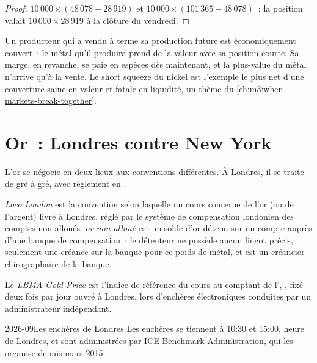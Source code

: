 \begin{proof}
$10\,000 \times (48\,078 - 28\,919)$ et $10\,000 \times (101\,365 - 48\,078)$~; la position valait
$10\,000 \times 28\,919$ à la clôture du vendredi.
\end{proof}

Un producteur qui a vendu à terme sa production future est économiquement couvert~: le métal
qu'il produira prend de la valeur avec sa position courte. Sa marge, en revanche, se paie en espèces dès maintenant, et la
plus-value du métal n'arrive qu'à la vente. Le short squeeze du nickel est l'exemple le plus net d'une couverture
saine en valeur et fatale en liquidité, un thème du \cref{ch:m3:when-markets-break-together}.

\section{Or~: Londres contre New York}

L'or se négocie en deux lieux aux conventions différentes. À Londres, il se traite de gré à gré,
avec règlement en .

\begin{definition}\label{def:m3:metals:loco}
\emph{Loco London} est la convention selon laquelle un cours concerne de l'or (ou de l'argent)
livré à Londres, réglé par le système de compensation londonien des comptes non alloués.
\emph{or non alloué} est un solde d'or détenu sur un compte auprès d'une banque
de compensation~: le détenteur ne possède aucun lingot précis, seulement une créance sur la banque pour ce poids de métal, et
est un créancier chirographaire de la banque.
\end{definition}

\begin{definition}\label{def:m3:metals:lbma}
Le \emph{LBMA Gold Price} est l'indice de référence du cours au comptant de l',
, fixé deux fois par jour ouvré à Londres, lors d'enchères électroniques conduites par un
administrateur indépendant.
\end{definition}

\begin{dated}{2026-09}{Les enchères de Londres}\label{dat:m3:metals:lbma}
Les enchères  se tiennent à 10:30 et 15:00, heure de Londres, et sont administrées par ICE Benchmark
Administration, qui les organise depuis mars 2015.
\end{dated}

